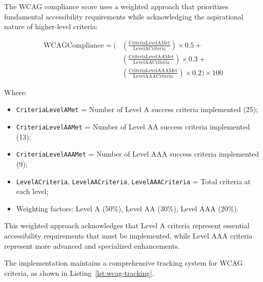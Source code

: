 The WCAG compliance score uses a weighted approach that prioritizes fundamental accessibility requirements while acknowledging the aspirational nature of higher-level criteria:

\begin{align}
\text{WCAGCompliance} = \Bigg(&\left(\frac{\text{CriteriaLevelAMet}}{\text{LevelACriteria}}\right) \times 0.5 + \\
&\left(\frac{\text{CriteriaLevelAAMet}}{\text{LevelAACriteria}}\right) \times 0.3 + \\
&\left(\frac{\text{CriteriaLevelAAAMet}}{\text{LevelAAACriteria}}\right) \times 0.2\Bigg) \times 100
\end{align}

Where:
\begin{itemize}
    \item \texttt{CriteriaLevelAMet} = Number of Level A success criteria implemented (25);
    \item \texttt{CriteriaLevelAAMet} = Number of Level AA success criteria implemented (13);
    \item \texttt{CriteriaLevelAAAMet} = Number of Level AAA success criteria implemented (9);
    \item \texttt{LevelACriteria}, \texttt{LevelAACriteria}, \texttt{LevelAAACriteria} = Total criteria at each level;
    \item Weighting factors: Level A (50\%), Level AA (30\%), Level AAA (20\%).
\end{itemize}

This weighted approach acknowledges that Level A criteria represent essential accessibility requirements that must be implemented, while Level AAA criteria represent more advanced and specialized enhancements.

The implementation maintains a comprehensive tracking system for WCAG criteria, as shown in Listing~\ref{lst:wcag-tracking}.

